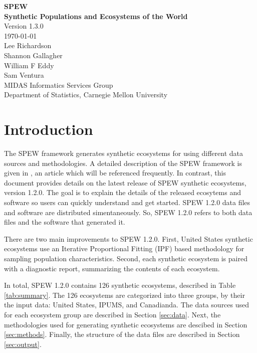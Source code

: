 \documentclass[font=9pt]{article}
\begin{document}
\begin{center}
\large{{\bf SPEW \\ Synthetic Populations and Ecosystems of the World}} \\ 
\vspace {2ex}
\large{Version 1.3.0} \\
\vspace{2ex}
\today \\
\vspace{2ex}
\large{Lee Richardson} \\	
\large{Shannon Gallagher} \\
\large{William F Eddy} \\
\large{Sam Ventura} \\
\vspace{5ex}
\large{MIDAS Informatics Services Group} \\
\vspace{2ex}
\large{Department of Statistics, Carnegie Mellon University}
\end{center}

\newpage 

\tableofcontents

\newpage 
\section{Introduction}
\label{sec:intro}
The SPEW framework generates synthetic ecosystems for using different data sources and methodologies. A detailed description of the SPEW framework is given in \cite{spew}, an article which will be referenced frequently. In contrast, this document provides details on the latest release of SPEW synthetic ecosystems, version 1.2.0. The goal is to explain the details of the released ecosytems and software so users can quickly understand and get started. SPEW 1.2.0 data files and software are distributed simentaneously. So, SPEW 1.2.0 refers to both data files and the software that generated it. 

There are two main improvements to SPEW 1.2.0. First, United States synthetic ecosystems use an Iterative Proportional Fitting (IPF) based methodology for sampling population characteristics. Second, each synthetic ecosystem is paired with a diagnostic report, summarizing the contents of each ecosystem. 

In total, SPEW 1.2.0 contains 126 synthetic ecosystems, described in Table \ref{tab:summary}. The 126 ecosystems are categorized into three groups, by their the input data: United States, IPUMS, and Canadianda. The data sources used for each ecosystem group are described in Section \ref{sec:data}. Next, the methodologies used for generating synthetic ecosystems are descibed in Section \ref{sec:methods}. Finally, the structure of the data files are described in Section \ref{sec:output}.
\end{document}

